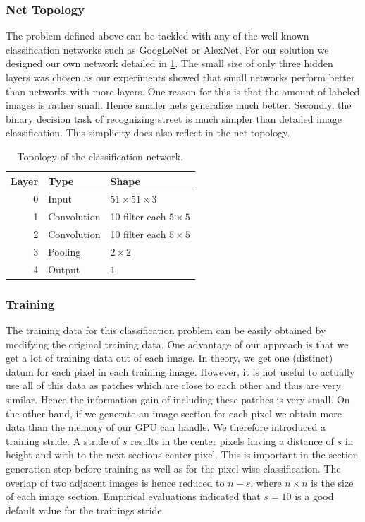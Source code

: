 \subsubsection{Net Topology}
The problem defined above can be tackled with any of the well known
classification networks such as GoogLeNet or AlexNet. For our solution we
designed our own network detailed in \cref{tab:topo}. The small size of only
three hidden layers was chosen as our experiments showed that small networks
perform better than networks with more layers. One reason for this is that the
amount of labeled images is rather small. Hence smaller nets generalize much
better. Secondly, the binary decision task of recognizing street is much
simpler than detailed image classification. This simplicity does also reflect
in the net topology.

\begin{table}[H]
	\normalsize
	\centering
\begin{tabular}{r  l l}
	\toprule
	\textbf{Layer} & \textbf{Type}  & \textbf{Shape}  \\
	\midrule
	0     & Input &  $51 \times 51 \times 3$ \\
	1     & Convolution & 10 filter  each $5 \times 5$ \\
	2     & Convolution & 10 filter  each $5 \times 5$  \\
	3     & Pooling     & $2 \times 2$ \\
	4     & Output     & $1$ \\
	\bottomrule
\end{tabular}
\caption{Topology of the classification network.}
\label{tab:topo}
\end{table}


\subsubsection{Training}
The training data for this classification problem can be easily obtained by
modifying the original training data. One advantage of our approach is that we
get a lot of training data out of each image. In theory, we get one (distinct)
datum for each pixel in each training image. However, it is not useful to
actually use all of this data as patches which are close to each other and thus
are very similar. Hence the information gain of including these patches is very
small. On the other hand, if we generate an image section for each pixel we
obtain more data than the memory of our GPU can handle. We therefore introduced
a training stride. A stride of $s$ results in the center pixels having a
distance of $s$ in height and with to the next sections center pixel. This is
important in the section generation step before training as well as for the
pixel-wise classification. The overlap of two adjacent images is hence reduced
to $n-s$, where $n \times n$ is the size of each image section. Empirical
evaluations indicated that $s=10$ is a good default value for the trainings
stride.

